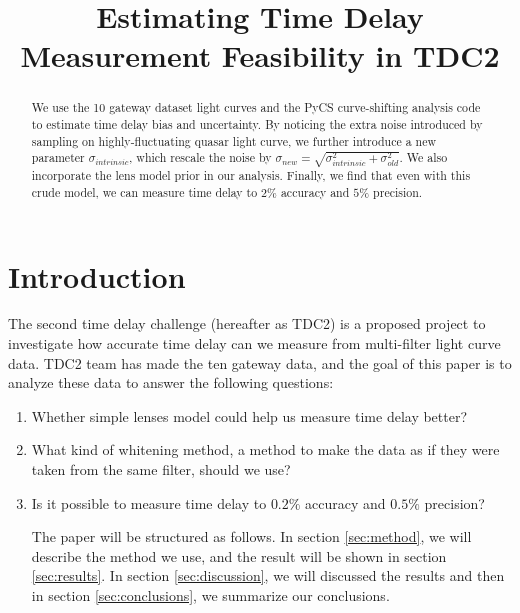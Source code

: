 \documentclass[\docopts]{\docclass}
\begin{document}
\title{ Estimating Time Delay Measurement Feasibility in TDC2 }

\maketitlepre

\begin{abstract}

We use the 10 gateway dataset light curves and the PyCS curve-shifting analysis code to estimate time delay bias and uncertainty. By noticing the extra noise introduced by sampling on highly-fluctuating quasar light curve, we further introduce a new parameter $\sigma_{intrinsic}$, which rescale the noise by $\sigma_{new}=\sqrt{\sigma_{intrinsic}^2+\sigma_{old}^2}$. We also incorporate the lens model prior in our analysis.  Finally, we find that even with this crude model, we can measure time delay to $2\%$ accuracy and $5\%$ precision. 


\end{abstract}


\maketitlepost

%

\section{Introduction}
\label{sec:intro}
The second time delay challenge (hereafter as TDC2) is a proposed project to investigate how accurate time delay can we measure from multi-filter light curve data.  TDC2 team has made the ten gateway data, and the goal of this paper is to analyze these data to answer the following questions:
\begin{enumerate}
\item Whether simple lenses model could help us measure time delay better?
\item What kind of whitening method, a method to make the data as if they were taken from the same filter, should we use?
\item Is it possible to measure time delay to $0.2\%$ accuracy and $0.5\%$ precision? 

The paper will be structured as follows.  In section \ref{sec:method}, we will describe the method we use, and the result will be shown in section \ref{sec:results}. In section \ref{sec:discussion}, we will discussed the results and then in section \ref{sec:conclusions}, we summarize our conclusions.  

\end{enumerate}
\end{document}
